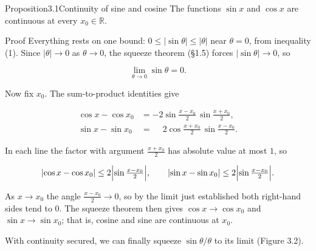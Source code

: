 \begin{hkproposition}{Proposition}{3.1}{Continuity of sine and cosine}
The functions \(\sin x\) and \(\cos x\) are continuous at every \(x_{0} \in \mathbb{R}\).
\end{hkproposition}
\begin{hkproof}{Proof}{}{}
Everything rests on one bound: \(0 \le \lvert \sin\theta \rvert \le \lvert \theta \rvert\) near \(\theta = 0\), from inequality (1). Since \(\lvert \theta \rvert \to 0\) as \(\theta \to 0\), the squeeze theorem (§1.5) forces \(\lvert \sin\theta \rvert \to 0\), so

\[ \lim_{\theta \to 0} \sin\theta = 0. \]

Now fix \(x_{0}\). The sum-to-product identities give

\[ \begin{aligned}
        \cos x - \cos x_{0} &= -2 \sin\frac{x - x_{0}}{2}\, \sin\frac{x + x_{0}}{2}, \\
        \sin x - \sin x_{0} &= \phantom{-}2 \cos\frac{x + x_{0}}{2}\, \sin\frac{x - x_{0}}{2}.
      \end{aligned} \]

In each line the factor with argument \(\tfrac{x + x_{0}}{2}\) has absolute value at most \(1\), so

\[ \lvert \cos x - \cos x_{0} \rvert \le 2\Bigl\lvert \sin\tfrac{x - x_{0}}{2} \Bigr\rvert, \qquad \lvert \sin x - \sin x_{0} \rvert \le 2\Bigl\lvert \sin\tfrac{x - x_{0}}{2} \Bigr\rvert. \]

As \(x \to x_{0}\) the angle \(\tfrac{x - x_{0}}{2} \to 0\), so by the limit just established both right-hand sides tend to \(0\). The squeeze theorem then gives \(\cos x \to \cos x_{0}\) and \(\sin x \to \sin x_{0}\); that is, cosine and sine are continuous at \(x_{0}\).
\end{hkproof}
With continuity secured, we can finally squeeze \(\sin\theta/\theta\) to its limit (Figure 3.2).

